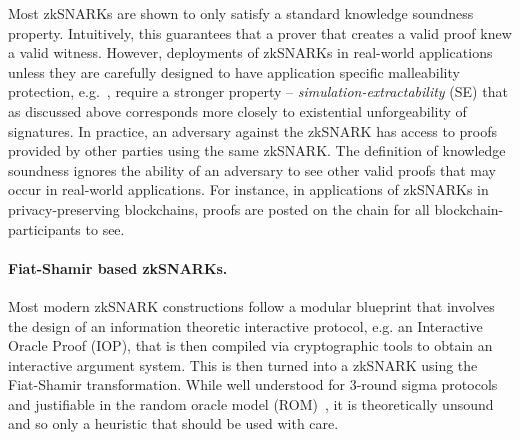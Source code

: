 Most zkSNARKs are shown to only satisfy a standard knowledge soundness property. Intuitively, this guarantees that
a prover that creates a valid proof knew a valid witness. However, deployments of zkSNARKs in real-world applications unless they are carefully designed to have application specific malleability protection, e.g.~\cite{SP:BCGGMT14}, require a stronger property -- \textit{simulation-extractability} (SE) that as discussed above corresponds more closely to existential unforgeability of signatures.
In practice, an adversary against the zkSNARK has access to proofs provided by other parties using the same
zkSNARK.  The definition of knowledge soundness ignores the ability of an adversary to see other valid proofs that may occur in real-world applications.  For instance, in applications of
zkSNARKs in privacy-preserving blockchains, proofs are posted on the chain for all
blockchain-participants to see.

\paragraph{Fiat-Shamir based zkSNARKs.}
Most modern zkSNARK constructions follow a modular blueprint that involves the design of an information theoretic interactive protocol, e.g. an Interactive Oracle Proof (IOP), that is then compiled via cryptographic tools to obtain an interactive argument system.  This is then turned into a zkSNARK using the Fiat-Shamir transformation. While well understood for 3-round sigma protocols and justifiable in the random oracle
model (ROM)~\cite{CCS:BelRog93}, it is theoretically
unsound~\cite{FOCS:GolKal03} and so only a heuristic that should be used with
care.

%

